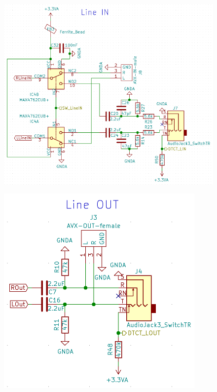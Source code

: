 \begin{figure} [H]
\begin{center}
 \includegraphics[scale=0.5]{../graphics/Schema_LineIN.png}
\caption{}
\label{fig:Schema_Codec}
\end{center}
\end{figure}

\begin{figure} [H]
\begin{center}
 \includegraphics[scale=0.5]{../graphics/Schema_LineOUT.png}
\caption{}
\label{fig:Schema_Codec}
\end{center}
\end{figure}

